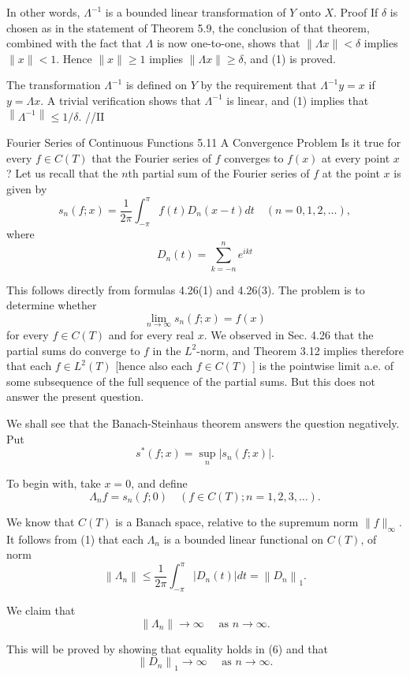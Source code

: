 In other words, $\Lambda^{-1}$ is a bounded linear transformation of $Y$ onto $X$.
Proof If $\delta$ is chosen as in the statement of Theorem 5.9, the conclusion of that theorem, combined with the fact that $\Lambda$ is now one-to-one, shows that $\|\Lambda x\|<\delta$ implies $\|x\|<1$. Hence $\|x\| \geq 1$ implies $\|\Lambda x\| \geq \delta$, and (1) is proved.

The transformation $\Lambda^{-1}$ is defined on $Y$ by the requirement that $\Lambda^{-1} y=x$ if $y=\Lambda x$. A trivial verification shows that $\Lambda^{-1}$ is linear, and (1) implies that $\left\|\Lambda^{-1}\right\| \leq 1 / \delta$.
//II

Fourier Series of Continuous Functions
5.11 A Convergence Problem Is it true for every $f \in C(T)$ that the Fourier series of $f$ converges to $f(x)$ at every point $x$ ?
Let us recall that the $n$th partial sum of the Fourier series of $f$ at the point $x$ is given by
$$
s_n(f ; x)=\frac{1}{2 \pi} \int_{-\pi}^\pi f(t) D_n(x-t) d t \quad(n=0,1,2, \ldots),
$$
where
$$
D_n(t)=\sum_{k=-n}^n e^{i k t}
$$

This follows directly from formulas 4.26(1) and 4.26(3).
The problem is to determine whether
$$
\lim _{n \rightarrow \infty} s_n(f ; x)=f(x)
$$
for every $f \in C(T)$ and for every real $x$. We observed in Sec. 4.26 that the partial sums do converge to $f$ in the $L^2$-norm, and Theorem 3.12 implies therefore that each $f \in L^2(T)$ [hence also each $f \in C(T)$ ] is the pointwise limit a.e. of some subsequence of the full sequence of the partial sums. But this does not answer the present question.

We shall see that the Banach-Steinhaus theorem answers the question negatively. Put
$$
s^*(f ; x)=\sup _n\left|s_n(f ; x)\right| .
$$

To begin with, take $x=0$, and define
$$
\Lambda_n f=s_n(f ; 0) \quad(f \in C(T) ; n=1,2,3, \ldots) .
$$

We know that $C(T)$ is a Banach space, relative to the supremum norm $\|f\|_{\infty}$. It follows from (1) that each $\Lambda_n$ is a bounded linear functional on $C(T)$, of norm
$$
\left\|\Lambda_n\right\| \leq \frac{1}{2 \pi} \int_{-\pi}^\pi\left|D_n(t)\right| d t=\left\|D_n\right\|_1 .
$$

We claim that
$$
\left\|\Lambda_n\right\| \rightarrow \infty \quad \text { as } n \rightarrow \infty .
$$

This will be proved by showing that equality holds in (6) and that
$$
\left\|D_n\right\|_1 \rightarrow \infty \quad \text { as } n \rightarrow \infty .
$$

